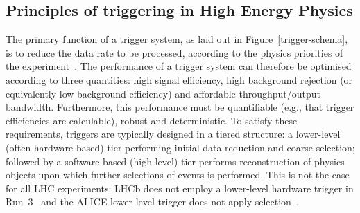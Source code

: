 \subsection{Principles of triggering in High Energy Physics}

The primary function of a trigger system, as laid out in Figure~\ref{trigger-schema}, is to reduce the data rate to be processed, according to the physics priorities of the  experiment~\cite{Jeitler_2017, Smith2020, Beck_2007}. 
The performance of a trigger system can therefore be optimised according to three quantities: high signal efficiency, high background rejection (or equivalently low background efficiency) and affordable throughput/output bandwidth. 
Furthermore, this performance must be quantifiable (e.g., that trigger efficiencies are calculable), robust and deterministic. 
To satisfy these requirements, triggers are typically designed in a tiered structure: a lower-level (often hardware-based) tier performing initial data reduction and coarse selection; followed by a software-based (high-level) tier performs reconstruction of physics objects upon which further selections of events is performed. 
This is not the case for all LHC experiments: LHCb does not employ a lower-level hardware trigger in Run~3~\cite{LHCb:upgrade_trigger_TDR} and the ALICE lower-level trigger does not apply selection~\cite{alice-trigger-run3}.


